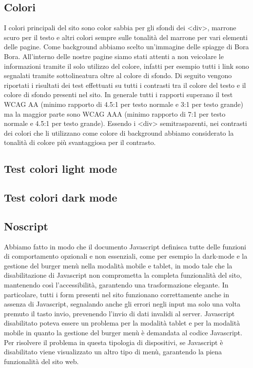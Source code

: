 \documentclass[a4paper]{article}
\begin{document}
    \subsection{Colori}
    I colori principali del sito sono color sabbia per gli sfondi dei <div>, marrone scuro per il testo e altri colori sempre sulle tonalità del marrone per vari elementi delle pagine. Come background abbiamo scelto un’immagine delle spiagge di Bora Bora. All’interno delle nostre pagine siamo stati attenti a non veicolare le informazioni tramite il solo utilizzo del colore, infatti per esempio tutti i link sono segnalati tramite sottolineatura oltre al colore di sfondo. Di seguito vengono riportati i risultati dei test effettuati su tutti i contrasti tra il colore del testo e il colore di sfondo presenti nel sito. In generale tutti i rapporti superano il test WCAG AA (minimo rapporto di 4.5:1 per testo normale e 3:1 per testo grande) ma la maggior parte sono WCAG AAA (minimo rapporto di 7:1 per testo normale e 4.5:1 per testo grande). Essendo i <div> semitrasparenti, nei contrasti dei colori che li utilizzano come colore di background abbiamo considerato la tonalità di colore più svantaggiosa per il contrasto.

    \subsection{Test colori light mode}

    \subsection{Test colori dark mode}

    \subsection{Noscript}
    Abbiamo fatto in modo che il documento Javascript definisca tutte delle funzioni di comportamento opzionali e non essenziali, come per esempio la dark-mode e la gestione del burger menù nella modalità mobile e tablet, in modo tale che la disabilitazione di Javascript non comprometta la completa funzionalità del sito, mantenendo così l’accessibilità, garantendo una trasformazione elegante. In particolare, tutti i form presenti nel sito funzionano correttamente anche in assenza di Javascript, segnalando anche gli errori negli input ma solo una volta premuto il tasto invio, prevenendo l’invio di dati invalidi al server. Javascript disabilitato poteva essere un problema per la modalità tablet e per la modalità mobile in quanto la gestione del burger menù è demandata al codice Javascript. Per risolvere il problema in questa tipologia di dispositivi, se Javascript è disabilitato viene visualizzato un altro tipo di menù, garantendo la piena funzionalità del sito web.
\end{document}
